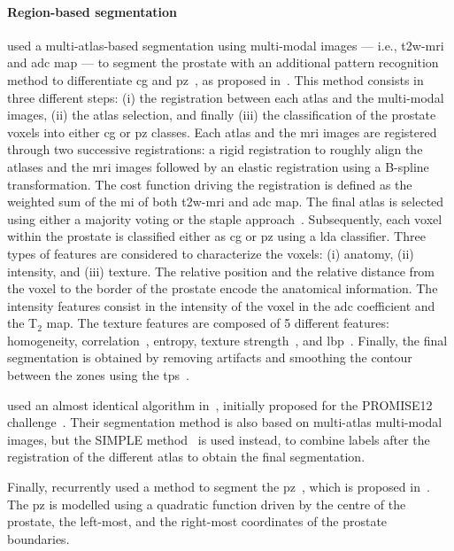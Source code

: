 \paragraph{Region-based segmentation}
\citeauthor{Litjens2012} used a multi-atlas-based segmentation using multi-modal images --- i.e., \ac{t2w}-\ac{mri} and \ac{adc} map --- to segment the prostate with an additional pattern recognition method to differentiate \ac{cg} and \ac{pz}~\cite{Litjens2012}, as proposed in~\cite{Litjens2012a}.
This method consists in three different steps: (i) the registration between each atlas and the multi-modal images, (ii) the atlas selection, and finally (iii) the classification of the prostate voxels into either \ac{cg} or \ac{pz} classes.
Each atlas and the \ac{mri} images are registered through two successive registrations: a rigid registration to roughly align the atlases and the \ac{mri} images followed by an elastic registration using a B-spline transformation.
The cost function driving the registration is defined as the weighted sum of the \ac{mi} of both \ac{t2w}-\ac{mri} and \ac{adc} map.
The final atlas is selected using either a majority voting or the \ac{staple} approach~\cite{Warfield2004}.
Subsequently, each voxel within the prostate is classified either as \ac{cg} or \ac{pz} using a \ac{lda} classifier.
Three types of features are considered to characterize the voxels: (i) anatomy, (ii) intensity, and (iii) texture.
The relative position and the relative distance from the voxel to the border of the prostate encode the anatomical information.
The intensity features consist in the intensity of the voxel in the \ac{adc} coefficient and the T$_2$ map.
The texture features are composed of 5 different features: homogeneity, correlation~\cite{Amadasun1989}, entropy, texture strength~\cite{Li2005a}, and \ac{lbp}~\cite{Ojala1996}.
Finally, the final segmentation is obtained by removing artifacts and smoothing the contour between the zones using the \ac{tps}~\cite{Bookstein1989}.

\citeauthor{Litjens2014} used an almost identical algorithm in~\cite{Litjens2014}, initially proposed for the PROMISE12 challenge~\cite{Litjens2014a}.
Their segmentation method is also based on multi-atlas multi-modal images, but the SIMPLE method~\cite{langerak2010label} is used instead, to combine labels after the registration of the different atlas to obtain the final segmentation.
 
Finally, \citeauthor{rampun2016computerb} recurrently used a method to segment the \ac{pz}~\cite{rampun2015classifying,rampun2015computer,rampun2016computer,rampun2016computerb,rampun2016quantitative}, which is proposed in~\cite{rampun2014detection}.
The \ac{pz} is modelled using a quadratic function driven by the centre of the prostate, the left-most, and the right-most coordinates of the prostate boundaries.

